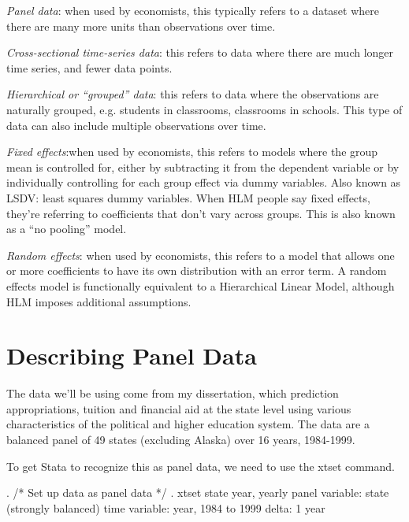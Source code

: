 \documentclass[12pt]{article}
\begin{document}
\begin{description}
\item \emph{Panel data}: when used by economists, this typically
  refers to a dataset where there are many more units than
  observations over time. 

\item \emph{Cross-sectional time-series data}: this refers to data
  where there are much longer time series, and fewer data points. 

\item \emph{Hierarchical or ``grouped'' data}: this refers to data
  where the observations are naturally grouped, e.g. students in
  classrooms, classrooms in schools. This type of data can also
  include multiple observations over time. 

\item \emph{Fixed effects}:when used by economists, this refers to
  models where the group mean is controlled for, either by subtracting
  it from the dependent variable or by individually controlling for
  each group effect via dummy variables. Also known as LSDV: least
  squares dummy variables. When HLM people say fixed effects, they're
  referring to coefficients that don't vary across groups. This is
  also known as a ``no pooling'' model. 


\item \emph{Random effects}: when used by economists, this refers to a
  model that allows one or more coefficients to have its own
  distribution with an error term. A random effects model is
  functionally equivalent to a Hierarchical Linear Model, although HLM
  imposes additional assumptions. 


\end{description}

\section{Describing Panel Data}

The data we'll be using come from my dissertation, which prediction
appropriations, tuition and financial aid at the state level using
various characteristics of the political and higher education
system. The data are a balanced panel of 49 states (excluding Alaska)
over 16 years, 1984-1999. 

To get Stata to recognize this as panel data, we need to use the xtset
command. 

\begin{stlog}
  . /* Set up data as panel data */
. xtset state year, yearly
       panel variable:  state (strongly balanced)
        time variable:  year, 1984 to 1999
                delta:  1 year
\end{stlog}
\end{document}
